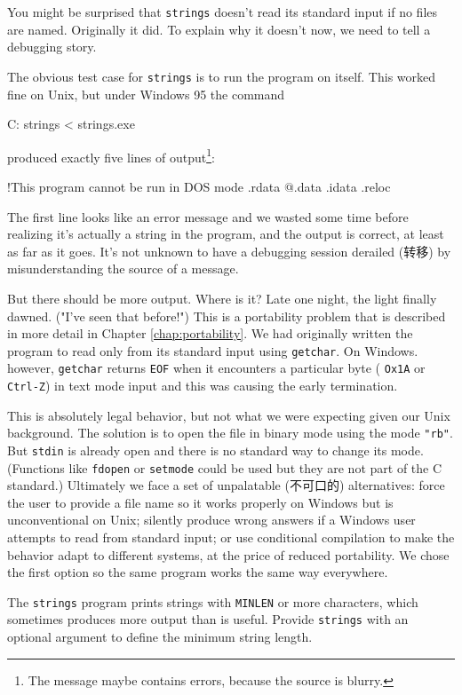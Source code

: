 You might be surprised that \verb'strings' doesn't read its standard input
if no files are named. Originally it did. To explain why it doesn't now, we
need to tell a debugging story.

The obvious test case for \verb'strings' is to run the program on itself.
This worked fine on Unix, but under Windows 95 the command
\begin{wellcode}
    C:\> strings < strings.exe
\end{wellcode}
produced exactly five lines of output\footnote{The message maybe contains
errors, because the source is blurry.}:
\begin{wellcode}
    !This program cannot be run in DOS mode
    .rdata
    @.data
    .idata
    .reloc
\end{wellcode}
The first line looks like an error message and we wasted some time before
realizing it's actually a string in the program, and the output is correct,
at least as far as it goes.  It's not unknown to have a debugging session
derailed (转移) by misunderstanding the source of a message.

But there should be more output. Where is it? Late one night, the light
finally dawned. ("I've seen that before!") This is a portability problem
that is described in more detail in Chapter \ref{chap:portability}.
We had originally written
the program to read only from its standard input using \verb'getchar'. On
Windows. however, \verb'getchar' returns \verb'EOF' when it encounters a
particular byte ( \verb'Ox1A' or \verb'Ctrl-Z') in text mode input and this
was causing the early termination.

This is absolutely legal behavior, but not what we were expecting given our
Unix background. The solution is to open the file in binary mode using the
mode \verb'"rb"'.  But \verb'stdin' is already open and there is no
standard way to change its mode. (Functions like \verb'fdopen' or
\verb'setmode' could be used but they are not part of the C standard.)
Ultimately we face a set of unpalatable (不可口的) alternatives: force the
user to provide a file name so it works properly on Windows but is
unconventional on Unix; silently produce wrong answers if a Windows user
attempts to read from standard input; or use conditional compilation to
make the behavior adapt to different systems, at the price of reduced
portability. We chose the first option so the same program works the same
way everywhere.

\begin{exercise}
    The \verb'strings' program prints strings with \verb'MINLEN' or more
    characters, which sometimes produces more output than is useful.
    Provide \verb'strings' with an optional argument to define the minimum
    string length.
\end{exercise}

